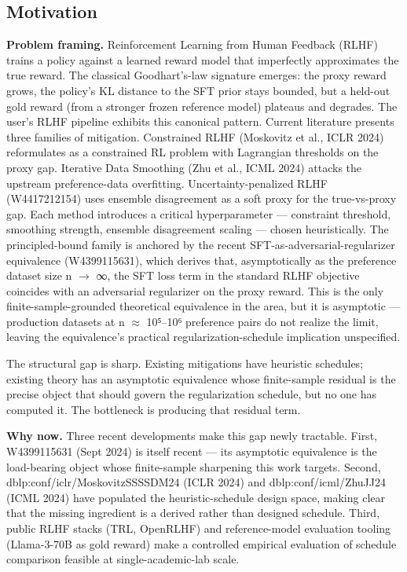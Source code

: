 \documentclass[10pt,a4paper]{article}
\begin{document}
\begin{tcolorbox}[colback=bgskill, colframe=cblue, title=\textbf{NoveltySkill — Idea Card (L3 Oral-Ready)}, breakable]
\section*{Motivation}
\textbf{Problem framing.} Reinforcement Learning from Human Feedback (RLHF) trains a policy against a learned reward model that imperfectly approximates the true reward. The classical Goodhart's-law signature emerges: the proxy reward grows, the policy's KL distance to the SFT prior stays bounded, but a held-out gold reward (from a stronger frozen reference model) plateaus and degrades. The user's RLHF pipeline exhibits this canonical pattern. Current literature presents three families of mitigation. Constrained RLHF (Moskovitz et al., ICLR 2024) reformulates as a constrained RL problem with Lagrangian thresholds on the proxy gap. Iterative Data Smoothing (Zhu et al., ICML 2024) attacks the upstream preference-data overfitting. Uncertainty-penalized RLHF (W4417212154) uses ensemble disagreement as a soft proxy for the true-vs-proxy gap. Each method introduces a critical hyperparameter --- constraint threshold, smoothing strength, ensemble disagreement scaling --- chosen heuristically. The principled-bound family is anchored by the recent SFT-as-adversarial-regularizer equivalence (W4399115631), which derives that, asymptotically as the preference dataset size n $\to$ ∞, the SFT loss term in the standard RLHF objective coincides with an adversarial regularizer on the proxy reward. This is the only finite-sample-grounded theoretical equivalence in the area, but it is asymptotic --- production datasets at n $\approx$ 10⁵--10⁶ preference pairs do not realize the limit, leaving the equivalence's practical regularization-schedule implication unspecified.

The structural gap is sharp. Existing mitigations have heuristic schedules; existing theory has an asymptotic equivalence whose finite-sample residual is the precise object that should govern the regularization schedule, but no one has computed it. The bottleneck is producing that residual term.

\textbf{Why now.} Three recent developments make this gap newly tractable. First, W4399115631 (Sept 2024) is itself recent --- its asymptotic equivalence is the load-bearing object whose finite-sample sharpening this work targets. Second, dblp:conf/iclr/MoskovitzSSSSDM24 (ICLR 2024) and dblp:conf/icml/ZhuJJ24 (ICML 2024) have populated the heuristic-schedule design space, making clear that the missing ingredient is a derived rather than designed schedule. Third, public RLHF stacks (TRL, OpenRLHF) and reference-model evaluation tooling (Llama-3-70B as gold reward) make a controlled empirical evaluation of schedule comparison feasible at single-academic-lab scale.


\end{tcolorbox}
\end{document}
